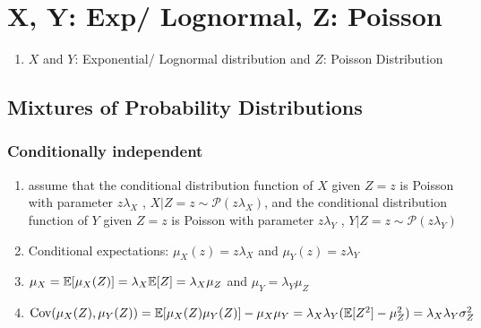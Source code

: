 \section{X, Y: Exp/ Lognormal, Z: Poisson}

\begin{enumerate}
    \item $X$ and $Y$: Exponential/ Lognormal distribution and $Z$: Poisson Distribution
    \hfill \cite{statistics/book/Statistics-for-Data-Scientists/Maurits-Kaptein}
\end{enumerate}


\subsection{Mixtures of Probability Distributions}

\subsubsection{Conditionally independent}

\begin{enumerate}
    \item assume that the conditional distribution function of $X$ given $Z = z$ is Poisson with parameter $z\lambda_X$ , $X|Z = z \sim \mathcal{P}(z\lambda_X )$, and the conditional distribution function of $Y$ given $Z = z$ is Poisson with parameter $z\lambda_Y$ , $Y |Z = z \sim \mathcal{P}(z\lambda_Y )$
    \hfill \cite{statistics/book/Statistics-for-Data-Scientists/Maurits-Kaptein}

    \item Conditional expectations: $\mu_X (z) = z\lambda_X$ and $\mu_Y (z) = z\lambda_Y$
    \hfill \cite{statistics/book/Statistics-for-Data-Scientists/Maurits-Kaptein}

    \item $\mu_X = \mathbb{E}[\mu_X (Z )] = \lambda_X \mathbb{E}[Z] = \lambda_X \mu_Z$ and $\mu_Y = \lambda_Y \mu_Z$ 
    \hfill \cite{statistics/book/Statistics-for-Data-Scientists/Maurits-Kaptein}

    \item 
    $
        \text{Cov}(\mu_X (Z ), \mu_Y (Z )) 
        = \mathbb{E}[\mu_X (Z )\mu_Y (Z )] - \mu_X \mu_Y 
        = \lambda_X \lambda_Y ( \mathbb{E}[Z^2] - \mu^2_Z ) 
        = \lambda_X \lambda_Y \sigma^2_Z 
    $
    \hfill \cite{statistics/book/Statistics-for-Data-Scientists/Maurits-Kaptein}
\end{enumerate}




